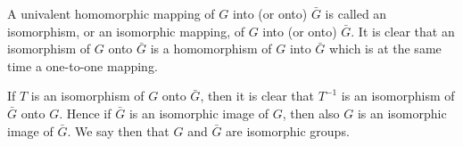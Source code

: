 A univalent homomorphic mapping of $G$ into (or onto) $\bar{G}$ is called an isomorphism, or an isomorphic mapping, of $G$ into (or onto) $\bar{G}$. It is clear that an isomorphism of $G$ onto $\bar{G}$ is a homomorphism of $G$ into $\bar{G}$ which is at the same time a one-to-one mapping.

If $T$ is an isomorphism of $G$ onto $\bar{G}$, then it is clear that $T^{-1}$ is an isomorphism of $\bar{G}$ onto $G$. Hence if $\bar{G}$ is an isomorphic image of $G$, then also $G$ is an isomorphic image of $\bar{G}$. We say then that $G$ and $\bar{G}$ are isomorphic groups.
